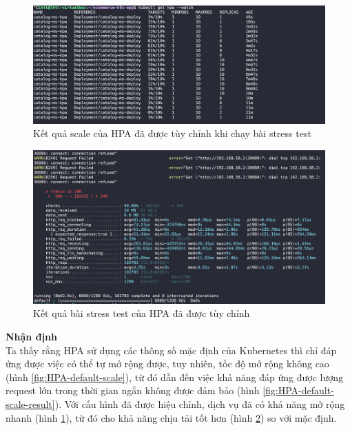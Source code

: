 \begin{figure}[H]
  \begin{center}
      \includegraphics[scale = 0.45]{images/hanh/hpa_efficent_test/custom}
      \vspace*{1mm}
  \end{center}
  \caption{Kết quả scale của HPA đã được tùy chỉnh khi chạy bài stress test}
  \label{fig:HPA-custom-scale}
\end{figure}
\begin{figure}[H]
  \begin{center}
      \includegraphics[scale = 0.45]{images/hanh/hpa_efficent_test/custom-result}
      \vspace*{1mm}
  \end{center}
  \caption{Kết quả bài stress test của HPA đã được tùy chỉnh}
  \label{fig:HPA-custom-scale-result}
\end{figure}
\textbf{Nhận định}\\[0.5cm]
Ta thấy rằng HPA sử dụng các thông số mặc định của Kubernetes thì chỉ đáp ứng được việc có thể tự mở rộng được, tuy nhiên, tốc độ mở rộng không cao (hình \ref{fig:HPA-default-scale}), từ đó dẫn đến việc khả năng đáp ứng được lượng request lớn trong thời gian ngắn không được đảm bảo (hình \ref{fig:HPA-default-scale-result}). Với cấu hình đã được hiệu chỉnh, dịch vụ đã có khả năng mở rộng nhanh (hình \ref{fig:HPA-custom-scale}), từ đó cho khả năng chịu tải tốt hơn (hình \ref{fig:HPA-custom-scale-result}) so với mặc định. 

